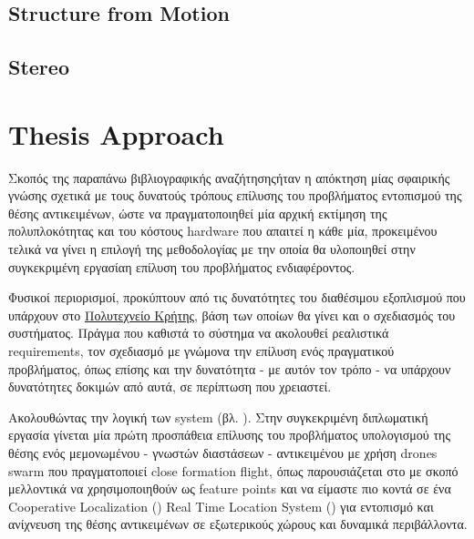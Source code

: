 \subsection{Structure from Motion} \label{sec:theo-structure-from-motion}

\subsection{Stereo} \label{sec:theo-stereo}

\section{Thesis Approach} \label{chap:thesis-approach}
Σκοπός της παραπάνω βιβλιογραφικής αναζήτησης\udot ήταν η απόκτηση μίας σφαιρικής γνώσης σχετικά με τους δυνατούς τρόπους επίλυσης του προβλήματος εντοπισμού της θέσης αντικειμένων, ώστε να πραγματοποιηθεί μία αρχική εκτίμηση της πολυπλοκότητας και του κόστους hardware που απαιτεί η κάθε μία, προκειμένου τελικά να γίνει η επιλογή της μεθοδολογίας με την οποία θα υλοποιηθεί στην συγκεκριμένη εργασία\udot η επίλυση του προβλήματος ενδιαφέροντος.

Φυσικοί περιορισμοί, προκύπτουν από τις δυνατότητες του διαθέσιμου εξοπλισμού που υπάρχουν στο \href{https://www.tuc.gr/}{Πολυτεχνείο Κρήτης}, βάση των οποίων θα γίνει και ο σχεδιασμός του συστήματος. Πράγμα που καθιστά το σύστημα να ακολουθεί ρεα\-λι\-στι\-κά requirements, τον σχεδιασμό με γνώμονα την επίλυση ενός πραγματικού προ\-βλή\-ματος, όπως επίσης και την δυνατότητα - με αυτόν τον τρόπο - να υπάρχουν δυνατότητες δοκιμών από αυτά, σε περίπτωση που χρειαστεί. 

Ακολουθώντας την λογική των  system (βλ. ). Στην συγκεκριμένη διπλωματική εργασία γίνεται μία πρώτη προσπάθεια επίλυσης του προ\-βλή\-μα\-τος υπολογισμού της θέσης ενός μεμονωμένου - γνωστών διαστάσεων - α\-ντι\-κει\-μένου με
χρήση drones swarm που πραγματοποιεί close formation flight, όπως παρουσιάζεται στο  με σκοπό μελλοντικά να
χρησιμοποιηθούν ως feature points και να είμαστε πιο κοντά σε ένα Cooperative Localization () Real Time Location System () για εντοπισμό και ανίχνευση της θέσης αντικειμένων σε εξωτερικούς χώρους και δυναμικά περιβάλλοντα.

